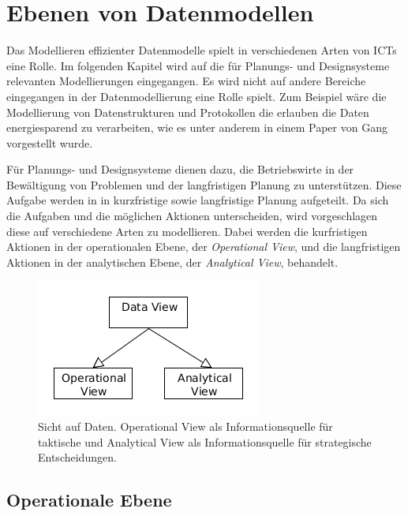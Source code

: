 \section{Ebenen von Datenmodellen}
Das Modellieren effizienter Datenmodelle spielt in verschiedenen Arten von ICTs eine Rolle. Im folgenden Kapitel wird auf die für Planungs- und Designsysteme relevanten Modellierungen eingegangen. Es wird nicht auf andere Bereiche eingegangen in der Datenmodellierung eine Rolle spielt. Zum Beispiel wäre die Modellierung von Datenstrukturen und Protokollen die erlauben die Daten energiesparend zu verarbeiten, wie es unter anderem in einem Paper von Gang\cite{jour:Lu2007} vorgestellt wurde.

Für Planungs- und Designsysteme dienen dazu, die Betriebswirte in der Bewältigung von Problemen und der langfristigen Planung zu unterstützen. Diese Aufgabe werden in \cite{jour:Schulze2007} in kurzfristige sowie langfristige Planung aufgeteilt. Da sich die Aufgaben und die möglichen Aktionen unterscheiden, wird vorgeschlagen diese auf verschiedene Arten zu modellieren. Dabei werden die kurfristigen Aktionen in der operationalen Ebene, der \textit{Operational View}, und die langfristigen Aktionen in der analytischen Ebene, der \textit{Analytical View}, behandelt.

\begin{figure}[h]
 \includegraphics[natwidth=\textwidth]{figures/datamodelling/dataviews.png}
 \centering
 \caption{Sicht auf Daten. Operational View als Informationsquelle für taktische und Analytical View als Informationsquelle für strategische Entscheidungen.\cite{jour:Schulze2007}}
\end{figure}

\subsection{Operationale Ebene}





